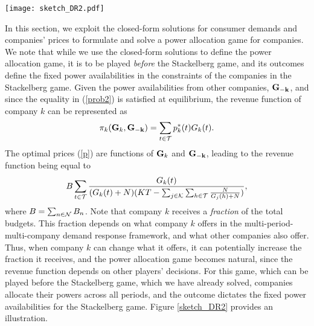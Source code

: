 
\begin{figure*}
\centering
\texttt{[image: sketch\_DR2.pdf]}
\caption{The interaction between companies and their consumers, along with power allocation. First, companies play a Nash power allocation game. Once power availabilities are allocated across all periods, companies and consumers play the Stackelberg game which dictates optimal prices and demand selection.}
\label{sketch_DR2}
\end{figure*}
In this section, we exploit the closed-form solutions for consumer demands and companies' prices to formulate and solve a power allocation game for companies. We note that while we use the closed-form solutions to define the power allocation game, it is to be played {\em{before}} the Stackelberg game, and its outcomes define the fixed power availabilities in the constraints of the companies in the Stackelberg game. Given the power availabilities from other companies, ${\bf{G_{-k}}}$, and since the equality in (\ref{prob2}) is satisfied at equilibrium, the revenue function of company $k$ can be represented as
\begin{equation} \pi_k({\bf{G}}_k,{\bf{G_{-k}}})=\sum_{t\in {\cal T}}p^*_k(t)G_k(t). \end{equation}  The optimal prices (\ref{p}) are functions of ${\bf{G}}_k$ and ${\bf{G_{-k}}}$, leading to the revenue function being equal to
\begin{equation} B\sum_{t\in {\cal T}}\frac{G_k(t)}{(G_k(t)+N)(KT-\sum_{j\in {\cal K}}\sum_{h\in {\cal T}}\frac{N}{G_j(h)+N})}, \label{Uk} \end{equation}
where $B=\sum_{n\in {\cal N}}B_n$. {Note that company $k$ receives a {\it fraction} of the total budgets. This fraction depends on what company $k$ offers in the multi-period-multi-company demand response framework, and what other companies also offer. Thus, when company $k$ can change what it offers, it can potentially increase the fraction it receives, and the power allocation game becomes natural, since the revenue function depends on other players' decisions. } For this game, which can be played before the Stackelberg game, which we have already solved, companies allocate their powers across all periods, and the outcome dictates the fixed power availabilities for the Stackelberg game. Figure \ref{sketch_DR2} provides an illustration. 



